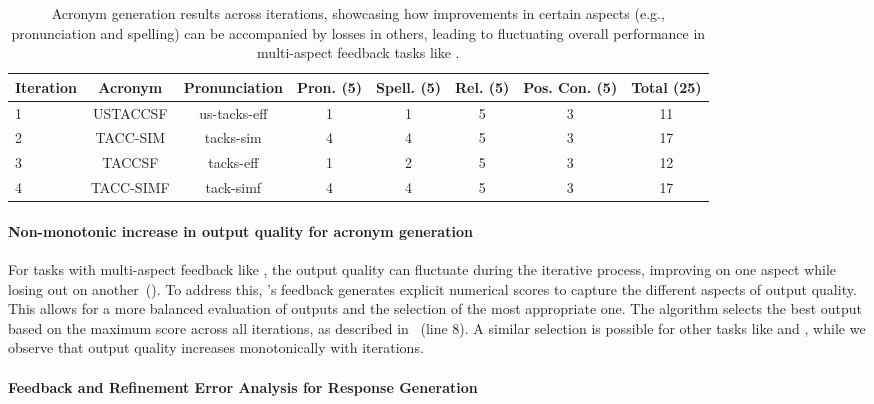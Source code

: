 \begin{table}[ht]
\centering
\begin{tabular}{@{}lccccccc@{}}
\toprule
Iteration & Acronym & Pronunciation & Pron. (5) & Spell. (5) & Rel. (5) & Pos. Con. (5) & Total (25) \\
\midrule
1 & USTACCSF & us-tacks-eff & 1 & 1 & 5 & 3 & 11 \\
2 & TACC-SIM & tacks-sim & 4 & 4 & 5 & 3 & 17 \\
3 & TACCSF & tacks-eff & 1 & 2 & 5 & 3 & 12 \\
4 & TACC-SIMF & tack-simf & 4 & 4 & 5 & 3 & 17 \\
\bottomrule
\end{tabular}
\caption{Acronym generation results across iterations, showcasing how improvements in certain aspects (e.g., pronunciation and spelling) can be accompanied by losses in others, leading to fluctuating overall performance in multi-aspect feedback tasks like \acrogen. }
\label{tab:acronym:fluc}
\end{table}


\paragraph{Non-monotonic increase in output quality for acronym generation} For tasks with multi-aspect feedback like \acrogen, the output quality can fluctuate during the iterative process, improving on one aspect while losing out on another~(). To address this, \ours's feedback  generates explicit numerical scores to capture the different aspects of output quality. This allows for a more balanced evaluation of outputs and the selection of the most appropriate one. The algorithm selects the best output based on the maximum score across all iterations, as described in ~(line 8). A similar selection is possible for other tasks like \gsm and \sentxfer, while we observe that output quality increases monotonically with iterations.


\paragraph{Feedback and Refinement Error Analysis for Response Generation}


